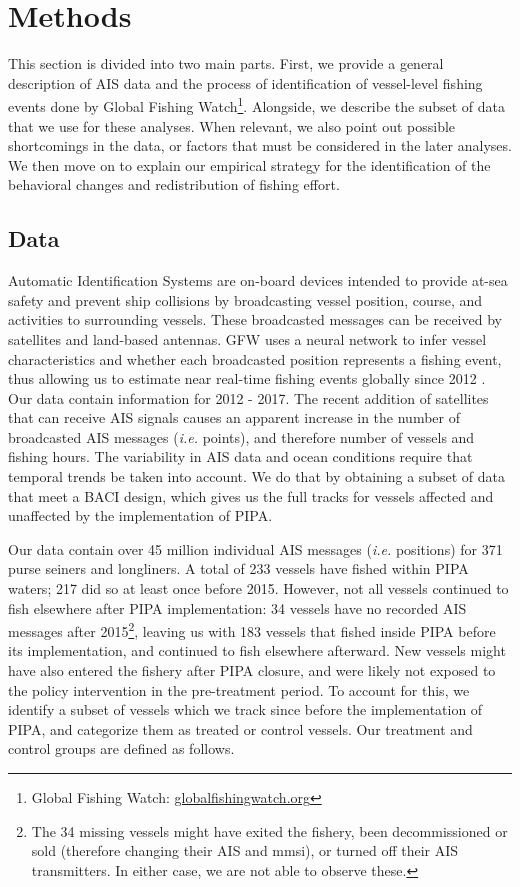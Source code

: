 \documentclass[12pt,]{article}
\let\rmarkdownfootnote\footnote%
\def\footnote{\protect\rmarkdownfootnote}
\begin{document}
\section{Methods}\label{methods}

This section is divided into two main parts. First, we provide a general
description of AIS data and the process of identification of
vessel-level fishing events done by Global Fishing Watch\footnote{Global
  Fishing Watch: \url{globalfishingwatch.org}}. Alongside, we describe
the subset of data that we use for these analyses. When relevant, we
also point out possible shortcomings in the data, or factors that must
be considered in the later analyses. We then move on to explain our
empirical strategy for the identification of the behavioral changes and
redistribution of fishing effort.

\subsection{Data}\label{data}

Automatic Identification Systems are on-board devices intended to
provide at-sea safety and prevent ship collisions by broadcasting vessel
position, course, and activities to surrounding vessels. These
broadcasted messages can be received by satellites and land-based
antennas. GFW uses a neural network to infer vessel characteristics and
whether each broadcasted position represents a fishing event, thus
allowing us to estimate near real-time fishing events globally since
2012 \citep{kroodsma_2018}. Our data contain information for 2012 -
2017. The recent addition of satellites that can receive AIS signals
causes an apparent increase in the number of broadcasted AIS messages
(\emph{i.e.} points), and therefore number of vessels and fishing hours.
The variability in AIS data and ocean conditions require that temporal
trends be taken into account. We do that by obtaining a subset of data
that meet a BACI design, which gives us the full tracks for vessels
affected and unaffected by the implementation of PIPA.

Our data contain over 45 million individual AIS messages (\emph{i.e.}
positions) for 371 purse seiners and longliners. A total of 233 vessels
have fished within PIPA waters; 217 did so at least once before 2015.
However, not all vessels continued to fish elsewhere after PIPA
implementation: 34 vessels have no recorded AIS messages after
2015\footnote{The 34 missing vessels might have exited the fishery, been
  decommissioned or sold (therefore changing their AIS and mmsi), or
  turned off their AIS transmitters. In either case, we are not able to
  observe these.}, leaving us with 183 vessels that fished inside PIPA
before its implementation, and continued to fish elsewhere afterward.
New vessels might have also entered the fishery after PIPA closure, and
were likely not exposed to the policy intervention in the pre-treatment
period. To account for this, we identify a subset of vessels which we
track since before the implementation of PIPA, and categorize them as
treated or control vessels. Our treatment and control groups are defined
as follows.
\end{document}
